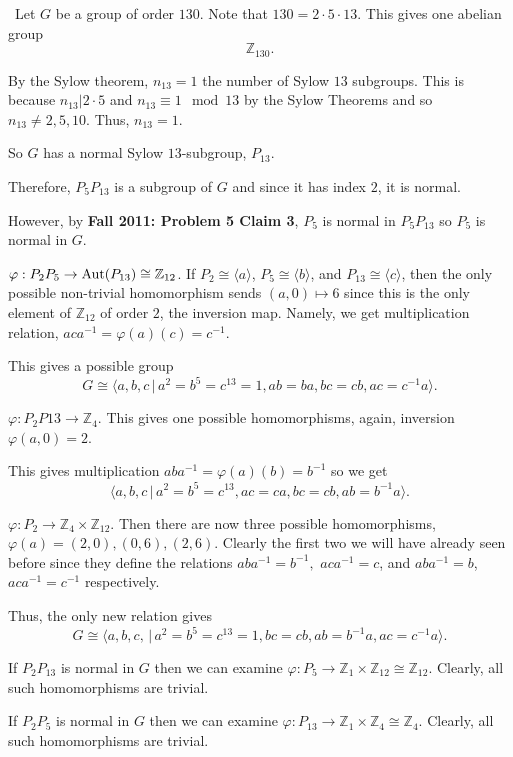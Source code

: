 \documentclass[12pt]{AlgebraQual}
\begin{document}
\begin{solution}$\,$
Let $G$ be a group of order $130.$ Note that $130=2\cdot 5\cdot 13$. This gives one abelian group $$\mathbb{Z}_{130}.$$

By the Sylow theorem, $n_{13}=1$ the number of Sylow $13$ subgroups. This is because $n_{13}|2\cdot 5$ and $n_{13}\equiv 1\mod 13$ by the Sylow Theorems and so $n_{13}\not=2,5,10.$ Thus, $n_{13}=1.$

So $G$ has a normal Sylow $13$-subgroup, $P_{13}$.

Therefore, $P_5P_{13}$ is a subgroup of $G$ and since it has index $2$, it is normal.

However, by \textbf{Fall 2011: Problem 5 Claim 3}, $P_5$ is normal in $P_5P_{13}$ so $P_5$ is normal in $G$.

 $\varphi: P_2P_5\to\text{Aut}(P_{13})\cong \mathbb{Z}_{12}$. If $P_2\cong\langle a\rangle$, $P_5\cong\langle b\rangle$, and $P_{13}\cong\langle c\rangle$, then the only possible non-trivial homomorphism sends $(a,0)\mapsto 6$ since this is the only element of $\mathbb{Z}_{12}$ of order $2$, the inversion map. Namely, we get multiplication relation, $aca^{-1}=\varphi(a)(c)=c^{-1}$.

This gives a possible group $$G\cong\langle a,b,c\,|\,a^2=b^5=c^{13}=1,ab=ba,bc=cb,ac=c^{-1}a\rangle.$$

 $\varphi:P_2P{13}\to \mathbb{Z}_4$. This gives one possible homomorphisms, again, inversion $\varphi(a,0)=2$.

This gives multiplication $aba^{-1}=\varphi(a)(b)=b^{-1}$ so we get $$\langle a,b,c\,|\,a^2=b^5=c^{13},ac=ca,bc=cb,ab=b^{-1}a\rangle.$$

 $\varphi:P_2\to \mathbb{Z}_4\times\mathbb{Z}_{12}$. Then there are now three possible homomorphisms, $\varphi(a)=(2,0),(0,6),(2,6)$. Clearly the first two we will have already seen before since they define the relations $aba^{-1}=b^{-1},$ $aca^{-1}=c$, and $aba^{-1}=b$, $aca^{-1}=c^{-1}$ respectively.

Thus, the only new relation gives $$G\cong\langle a,b,c,\,|\,a^2=b^5=c^{13}=1,bc=cb,ab=b^{-1}a,ac=c^{-1}a\rangle.$$

 If $P_2P_{13}$ is normal in $G$ then we can examine $\varphi:P_5\to \mathbb{Z}_1\times\mathbb{Z}_{12}\cong\mathbb{Z}_{12}$. Clearly, all such homomorphisms are trivial.

 If $P_2P_5$ is normal in $G$ then we can examine $\varphi:P_{13}\to \mathbb{Z}_1\times\mathbb{Z}_4\cong\mathbb{Z}_4$. Clearly, all such homomorphisms are trivial.


\end{solution}
\end{document}
